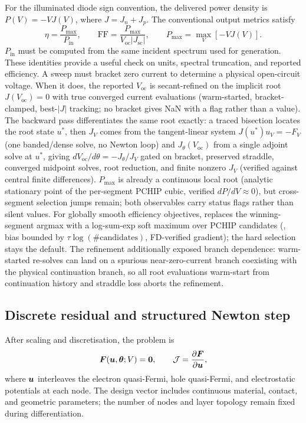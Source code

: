 For the illuminated diode sign convention, the delivered power density is
$P(V)=-VJ(V)$, where $J=J_n+J_p$. The conventional output metrics
satisfy~\cite{mann2022partial}
\begin{equation}
\eta=\frac{P_{\max}}{P_{\mathrm{in}}},\qquad
\mathrm{FF}=\frac{P_{\max}}{V_{\mathrm{oc}}|J_{\mathrm{sc}}|},\qquad
P_{\max}=\max_V[-VJ(V)].\label{eq:metrics}
\end{equation}
$P_{\mathrm{in}}$ must be computed from the same incident spectrum used
for generation. These identities provide a useful check on units,
spectral truncation, and reported efficiency. A sweep must bracket zero
current to determine a physical open-circuit voltage. When it does, the
reported $V_{\mathrm{oc}}$ is secant-refined on the implicit root
$J(V_{\mathrm{oc}})=0$ with true converged current evaluations
(warm-started, bracket-clamped, best-$|J|$ tracking; no bracket gives NaN
with a  flag rather than a value). The backward pass
differentiates the same root exactly: a traced bisection locates the root
state $u^*$, then $J_V$ comes from the tangent-linear system
$J(u^*)u_V=-F_V$ (one banded/dense solve, no Newton loop) and
$J_\theta(V_{\mathrm{oc}})$ from a single adjoint solve at $u^*$,
giving $dV_{\mathrm{oc}}/d\theta=-J_\theta/J_V$ gated on bracket,
preserved straddle, converged midpoint solves, root reduction, and
finite nonzero $J_V$ (verified against central finite differences).
$P_{\max}$ is already a continuous local root (analytic stationary point
of the per-segment PCHIP cubic, verified $dP/dV\approx0$), but
cross-segment selection jumps remain; both observables carry status
flags rather than silent values. For globally smooth efficiency
objectives,  replaces the winning-segment
argmax with a log-sum-exp soft maximum over PCHIP candidates
(, bias bounded by $\tau\log(\#\mathrm{candidates})$,
FD-verified gradient); the hard selection stays the default. The refinement additionally exposed
branch dependence: warm-started re-solves can land on a spurious
near-zero-current branch coexisting with the physical continuation
branch, so all root evaluations warm-start from continuation history
and straddle loss aborts the refinement.

\subsection{Discrete residual and structured Newton step}\label{sec:newton}
After scaling and discretisation, the problem is
\begin{equation}
\boldsymbol{F}(\boldsymbol{u},\boldsymbol{\theta};V)=\boldsymbol{0},\qquad
\mathcal{J}=\frac{\partial\boldsymbol{F}}{\partial\boldsymbol{u}},\label{eq:root}
\end{equation}
where $\boldsymbol{u}$ interleaves the electron quasi-Fermi, hole quasi-Fermi,
and electrostatic potentials at each node. The design vector includes
continuous material, contact, and geometric parameters; the number of
nodes and layer topology remain fixed during differentiation.

